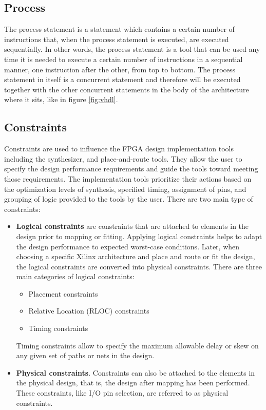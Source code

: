 \subsection{Process}
\noindent The process statement is a statement which contains a certain number of instructions that, when the process statement is executed, are executed sequentially. In other words, the process statement is a tool that can be used any time it is needed to execute a certain number of instructions in a sequential manner, one instruction after the other, from top to bottom.
\newline
The process statement in itself is a concurrent statement and therefore will be executed together with the other concurrent statements in the body of the architecture where it sits, like in figure \ref{fig:vhdl}.

\subsection{Constraints}
\noindent Constraints\cite{constraints1} are used to influence the FPGA design implementation tools including the
synthesizer, and place-and-route tools. They allow the user to specify the design
performance requirements and guide the tools toward meeting those requirements. The
implementation tools prioritize their actions based on the optimization levels of synthesis,
specified timing, assignment of pins, and grouping of logic provided to the tools by the user.
There are two main type of constraints: 
\begin{itemize}
	\item \textbf{Logical constraints} are constraints that are attached to elements in the design prior to
	mapping or fitting. Applying logical constraints helps to adapt the design performance to expected worst-case conditions. Later, when choosing a specific Xilinx architecture and place and route or fit the design, the logical constraints are converted into physical constraints\cite{constraints2}.
	\newline
	There are three main categories of logical constraints:
	\begin{itemize}
		\item Placement constraints
		\item Relative Location (RLOC) constraints
		\item Timing constraints
	\end{itemize}
	Timing constraints allow to specify the maximum allowable delay or skew on any given set of paths or nets in the design.
	
	\item \textbf{Physical constraints}. Constraints can also be attached to the elements in the physical design, that is, the design
	after mapping has been performed. These constraints, like I/O pin selection, are referred to as physical constraints.	 
\end{itemize}
